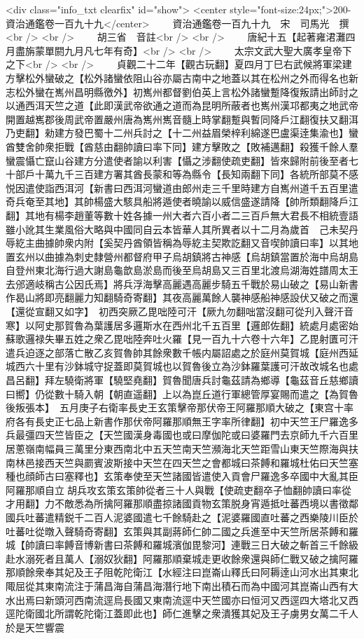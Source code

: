 <div class="info_txt clearfix" id="show">
<center style="font-size:24px;">200-資治通鑑卷一百九十九</center>
  　　資治通鑑卷一百九十九　宋　司馬光　撰<br />
<br />
　　胡三省　音註<br />
<br />
　　唐紀十五【起著雍涒灘四月盡旃蒙單閼九月凡七年有奇】<br />
<br />
　　太宗文武大聖大廣孝皇帝下之下<br />
<br />
　　貞觀二十二年【觀古玩翻】夏四月丁巳右武候將軍梁建方擊松外蠻破之【松外諸蠻依阻山谷亦屬古南中之地蓋以其在松州之外而得名也新志松外蠻在嶲州昌明縣徼外】初嶲州都督劉伯英上言松外諸蠻蹔降復叛請出師討之以通西洱天竺之道【此即漢武帝欲通之道而為昆明所蔽者也嶲州漢邛都夷之地武帝開置越嶲郡後周武帝置嚴州唐為嶲州嶲音髓上時掌翻蹔與暫同降戶江翻復扶又翻洱乃吏翻】勑建方發巴蜀十二州兵討之【十二州益眉榮梓利綿遂巴盧渠逹集渝也】蠻酋雙舍帥衆拒戰【酋慈由翻帥讀曰率下同】建方擊敗之【敗補邁翻】殺獲千餘人羣蠻震懾亡竄山谷建方分遣使者諭以利害【懾之涉翻使疏吏翻】皆來歸附前後至者七十部戶十萬九千三百建方署其酋長蒙和等為縣令【長知兩翻下同】各統所部莫不感悦因遣使詣西洱河【新書曰西洱河蠻道由郎州走三千里時建方自嶲州道千五百里遣奇兵奄至其地】其帥楊盛大駭具船將遁使者曉諭以威信盛遂請降【帥所類翻降戶江翻】其地有楊李趙董等數十姓各據一州大者六百小者二三百戶無大君長不相統壹語雖小訛其生業風俗大略與中國同自云本皆華人其所異者以十二月為歲首　己未契丹辱紇主曲據帥衆内附【奚契丹酋領皆稱為辱紇主契欺訖翻又音喫帥讀曰率】以其地置玄州以曲據為刺史隸營州都督府甲子烏胡鎮將古神感【烏胡鎮當置於海中烏胡島自登州東北海行過大謝島龜歆島淤島而後至烏胡島又三百里北渡烏湖海姓譜周太王去邠適岐稱古公因氏焉】將兵浮海擊高麗遇高麗步騎五千戰於易山破之【易山新書作曷山將即亮翻麗力知翻騎奇寄翻】其夜高麗萬餘人襲神感船神感設伏又破之而還【還從宣翻又如字】　初西突厥乙毘咄陸可汗【厥九勿翻咄當沒翻可從刋入聲汗音寒】以阿史那賀魯為葉護居多邏斯水在西州北千五百里【邏郎佐翻】統處月處密始蘇歌邏禄失畢五姓之衆乙毘咄陸奔吐火羅【見一百九十六卷十六年】乙毘射匱可汗遣兵迫逐之部落亡散乙亥賀魯帥其餘衆數千帳内屬詔處之於庭州莫賀城【庭州西延城西六十里有沙鉢城守捉蓋即莫賀城也以賀魯後立為沙鉢羅葉護可汗故改城名也處昌呂翻】拜左驍衛將軍【驍堅堯翻】賀魯聞唐兵討龜茲請為鄉導【龜茲音丘慈鄉讀曰嚮】仍從數十騎入朝【朝直遥翻】上以為崑丘道行軍總管厚宴賜而遣之【為賀魯後叛張本】　五月庚子右衛率長史王玄策擊帝那伏帝王阿羅那順大破之【東宫十率府各有長史正七品上新書作那伏帝阿羅那順無王字率所律翻】初中天竺王尸羅逸多兵最彊四天竺皆臣之【天竺國漢身毒國也或曰摩伽陀或曰婆羅門去京師九千六百里居蔥嶺南幅員三萬里分東西南北中五天竺南天竺瀕海北天竺距雪山東天竺際海與扶南林邑接西天竺與罽賓波斯接中天竺在四天竺之會都城曰茶餺和羅城杜佑曰天竺塞種也顔師古曰塞釋也】玄策奉使至天竺諸國皆遣使入貢會尸羅逸多卒國中大亂其臣阿羅那順自立胡兵攻玄策玄策帥從者三十人與戰【使疏吏翻卒子恤翻帥讀曰率從才用翻】力不敵悉為所擒阿羅那順盡掠諸國貢物玄策脱身宵遁抵吐蕃西境以書徵鄰國兵吐蕃遣精鋭千二百人泥婆國遣七千餘騎赴之【泥婆羅國直吐蕃之西樂陵川臣於吐蕃吐從暾入聲騎奇寄翻】玄策與其副蔣師仁帥二國之兵進至中天竺所居茶餺和羅城【帥讀曰率餺音博新書曰茶餺和羅城濱伽毘黎河】連戰三日大破之斬首三千餘級赴水溺死者且萬人【溺奴狄翻】阿羅那順棄城走更收餘衆還與師仁戰又破之擒阿羅那順餘衆奉其妃及王子阻乾陀衛江【水經注曰崑崙山釋氏曰阿耨逹山河水出其東北陬屈從其東南流注于蒲昌海自蒲昌海潛行地下南出積石而為中國河其崑崙山西有大水出焉曰新頭河西南流逕烏長國又東南流逕中天竺國亦曰恒河又西逕四大塔北又西逕陀衛國北所謂乾陀衛江蓋即此也】師仁進擊之衆潰獲其妃及王子虜男女萬二千人於是天竺響震